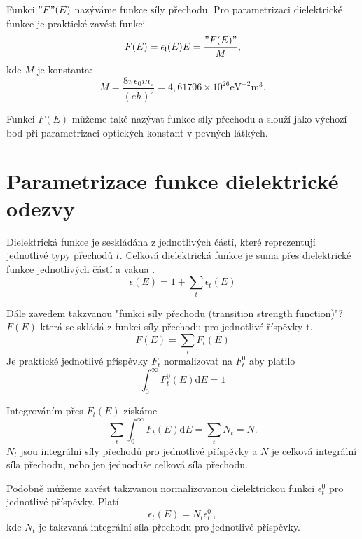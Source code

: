Funkci $"F"(E)$ nazýváme funkce síly přechodu. Pro parametrizaci dielektrické funkce je praktické zavést funkci
\begin{equation}
F(E) = \epsilon_\mathrm{i}(E) E = \frac{"F(E)"}{M}\mathrm{,}
\end{equation}  
kde $M$ je konstanta:
\begin{equation} 
M = \frac{8 \pi \epsilon_0 m_\mathrm{e}}{(e h)^2} = 4,61706\times10^{26} \mathrm{eV}^{-2}\mathrm{m}^3 \mathrm{.}
\end{equation}

Funkci $F(E)$ můžeme také nazývat funkce síly přechodu a slouží jako výchozí bod při parametrizaci optických konstant v pevných látkých.

\section{Parametrizace funkce dielektrické odezvy}
Dielektrická funkce je seskládána z jednotlivých částí, které reprezentují jednotlivé typy přechodů $t$. Celková dielektrická funkce je suma přes dielektrické funkce jednotlivých částí a vakua \cite{sumrule1}. 
\begin{equation}
\epsilon(E) = 1 + \sum_t \epsilon_t(E)
\label{suma1}
\end{equation}

Dále zavedem takzvanou "funkci síly přechodu (transition strength function)"? $F(E)$ která se skládá z funkci síly přechodu pro jednotlivé říspěvky t.
\begin{equation}
F(E) = \sum_t F_t(E)
\end{equation}
Je praktické jednotlivé příspěvky $F_t$ normalizovat na $F_t^0$ aby platilo
\begin{equation}
\int_0^\infty F_t^0(E)\mathrm{d}E = 1
\end{equation}

Integrováním přes $F_t(E)$ získáme 
\begin{equation}
\label{definiceceelkovesily}
\sum_t \int_0^\infty F_t(E)\mathrm{d}E = \sum_t N_t = N \mathrm{.}
\end{equation}
$N_t$ jsou integrální síly přechodů pro jednotlivé příspěvky a $N$ je celková integrální síla přechodu, nebo jen jednoduše celková síla přechodu.  

Podobně můžeme zavést takzvanou normalizovanou dielektrickou funkci $\epsilon_t^0$ pro jednotlivé příspěvky. Platí 
\begin{equation}
\epsilon_t(E) = N_t \epsilon_t^0  \, \mathrm{,}
\end{equation}
kde $N_t$ je takzvaná integrální síla přechodu pro jednotlivé příspěvky.

